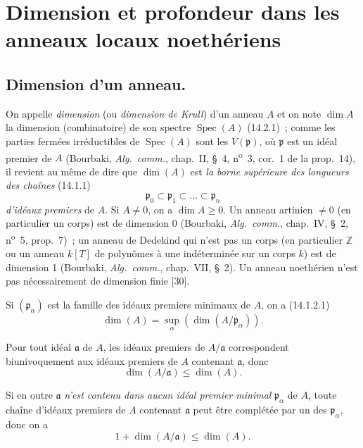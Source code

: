 \section{Dimension et profondeur dans les anneaux locaux noethériens}
\label{section:0.16-fr}

\subsection{Dimension d'un anneau.}
\label{subsection:0.16.1-fr}

\begin{env}[16.1.1]
\label{0.16.1.1-fr}
On appelle \emph{dimension} (ou \emph{dimension de Krull}) d'un anneau $A$ et on note
$\dim A$ la dimension (combinatoire) de son spectre
$\operatorname{Spec}(A)$ (14.2.1)~; comme les parties fermées irréductibles de
$\operatorname{Spec}(A)$ sont les
$V(\mathfrak{p})$, où $\mathfrak{p}$ est un idéal premier de $A$ (Bourbaki,
\emph{Alg.~comm.}, chap.~II, \S~4, n\textsuperscript{o}~3, cor.~1 de la prop.~14), il revient au
même de dire que $\dim(A)$ est \emph{la borne supérieure des longueurs des chaînes}
(14.1.1)
\[
  \mathfrak{p}_0\subset\mathfrak{p}_1\subset\ldots\subset\mathfrak{p}_n
\]
\emph{d'idéaux premiers} de $A$. Si $A\neq0$, on a $\dim A\geq0$. Un anneau artinien
$\neq0$ (en particulier un corps) est de dimension 0 (Bourbaki,
\emph{Alg.~comm.}, chap.~IV, \S~2, n\textsuperscript{o}~5, prop.~7)~; un anneau de Dedekind qui
n'est pas un corps (en particulier $\mathbb{Z}$ ou un anneau $k[T]$ de
polynômes à une indéterminée sur un corps $k$) est de dimension 1 (Bourbaki,
\emph{Alg.~comm.}, chap.~VII, \S~2). Un anneau noethérien n'est pas
nécessairement de dimension finie [30].

Si $(\mathfrak{p}_\alpha)$ est la famille des idéaux premiers minimaux de $A$,
on a (14.1.2.1)
\[
\label{0.16.1.1.1-fr}
  \dim(A)=\sup_\alpha(\dim(A/\mathfrak{p}_\alpha)).
\tag{16.1.1.1}
\]
\end{env}

\begin{env}[16.1.2]
\label{0.16.1.2-fr}
Pour tout idéal $\mathfrak{a}$ de $A$, les idéaux premiers de
$A/\mathfrak{a}$ correspondent biunivoquement aux idéaux premiers de $A$
contenant $\mathfrak{a}$, donc
\[
\label{0.16.1.2.1-fr}
  \dim(A/\mathfrak{a})\leq\dim(A).
\tag{16.1.2.1}
\]

Si en outre $\mathfrak{a}$ \emph{n'est contenu dans aucun idéal premier minimal}
$\mathfrak{p}_\alpha$ de $A$, toute chaîne d'idéaux premiers de $A$ contenant
$\mathfrak{a}$ peut être complétée par un des $\mathfrak{p}_\alpha$, donc on a
\[
\label{0.16.1.2.2-fr}
  1+\dim(A/\mathfrak{a})\leq\dim(A).
\tag{16.1.2.2}
\]
\end{env}


